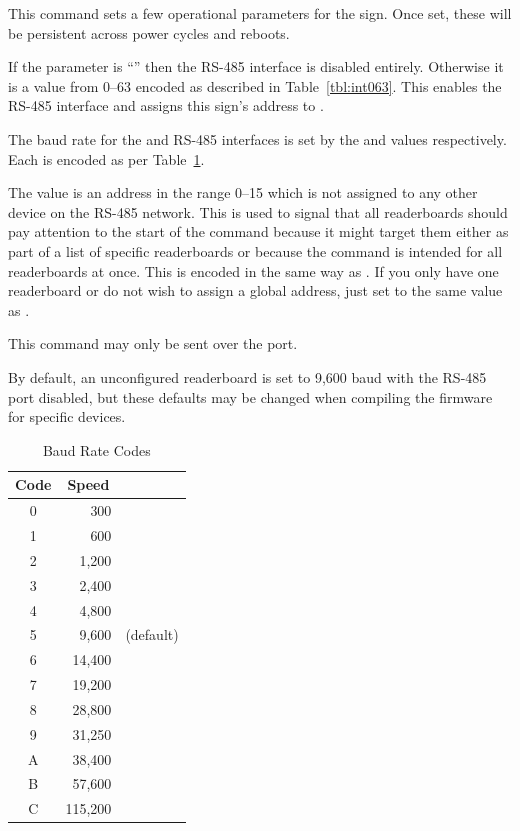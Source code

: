 This command sets a few operational parameters for the sign. Once set, these will be persistent across
power cycles and reboots.

If the  parameter is ``'' then the RS-485 interface is disabled entirely. Otherwise it is a
value from 0--63 encoded as described in Table~\ref{tbl:int063}. This enables the RS-485 interface and assigns
this sign's address to .

The baud rate for the  and RS-485 interfaces is set by the  and  values
respectively. Each is encoded as per Table~\ref{tbl:baudcodes}.

The  value is an address in the range 0--15 which is not assigned
to any other device on the RS-485 network. This is used to signal that all
readerboards should pay attention to the start of the command because it might
target them either as part of a list of specific readerboards or because the
command is intended for all readerboards at once. This is encoded in the 
same way as .
If you only have one readerboard or do not wish to assign a global address,
just set  to the same value as .

This command may only be sent over the  port.

By default, an unconfigured readerboard is set to 9,600 baud with the RS-485 port disabled, but these
defaults may be changed when compiling the firmware for specific devices.
\begin{table}
	\begin{center}
		\begin{tabular}{crl}\toprule
			\bfseries Code & \multicolumn{1}{c}{\bfseries Speed} \\\midrule
			0 & 300\\
			1 & 600\\
			2 & 1,200\\
			3 & 2,400\\
			4 & 4,800\\
			5 & 9,600 & (default)\\
			6 & 14,400\\
			7 & 19,200\\
			8 & 28,800\\
			9 & 31,250\\
			A & 38,400\\
			B & 57,600\\
			C & 115,200\\
		\bottomrule
		\end{tabular}
		\caption{Baud Rate Codes\label{tbl:baudcodes}}
	\end{center}
\end{table}

